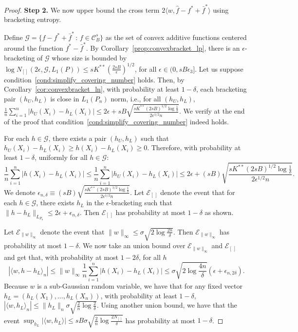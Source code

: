 \begin{proof}


\textbf{Step 2.} We now upper bound the cross term $2 \langle w,
\hat{f} - f^* + \bar{f}^* \rangle$ using bracketing entropy.

Define $\mathcal{G} =\{ f - f^* + \bar{f}^* \,:\, f \in
\mathcal{C}^s_B \}$ 
as the set of convex additive functions centered around the function $f^* - \bar{f}^*$. 
By Corollary~\ref{prop:convexbracket_lp}, there is an $\epsilon$-bracketing of $\mathcal{G}$ whose size is bounded by $\log N_{[]}( 2\epsilon, \mathcal{G}, L_1(P)) \leq sK^{**} \left( \frac{2sB}{\epsilon} \right)^{1/2}$, for all $\epsilon \in (0, sB \epsilon_3]$.
Let us suppose condition~\ref{cond:simplify_covering_number} holds. Then, by Corollary~\ref{cor:convexbracket_ln}, with probability at least $1-\delta$, each bracketing pair $(h_U, h_L)$ is close in $L_1(P_n)$ norm, i.e., for all $(h_U, h_L)$, 
$\frac{1}{n} \sum_{i=1}^n | h_U(X_i) - h_L(X_i) | \leq 2 \epsilon + sB \sqrt{ \frac{sK^{**}(2sB
)^{1/2} \log \frac{1}{\delta}}{2\epsilon^{1/2} n}}$. We verify at the
end of the proof that 
condition~\ref{cond:simplify_covering_number} indeed holds.

For each $h \in \mathcal{G}$, there exists a pair $(h_U, h_L)$ such that $h_U(X_i) - h_L(X_i) \geq h(X_i) - h_L(X_i) \geq 0$. Therefore, with probability at least $1-\delta$, uniformly for all $h \in \mathcal{G}$:
$$
\frac{1}{n} \sum_{i=1}^n |h(X_i) - h_L(X_i)| \leq \frac{1}{n} \sum_{i=1}^n | h_U(X_i) - h_L(X_i)| \leq 2\epsilon +  (sB) \sqrt{ \frac{sK^{**}(2sB)^{1/2} \log \frac{1}{\delta}}{2\epsilon^{1/2} n}}.
$$
We denote $\epsilon_{n,\delta} \equiv (sB) \sqrt{
  \frac{sK^{**}(2sB)^{1/2} \log \frac{1}{\delta}}{2\epsilon^{1/2}
    n}}$. Let $\mathcal{E}_{[\,]}$ denote the event that for each $h
\in \mathcal{G}$, there exists $h_L$ in the $\epsilon$-bracketing such
that $\|h-h_L\|_{L_{P_n}} \leq 2\epsilon + \epsilon_{n, \delta}$. Then
$\mathcal{E}_{[\,]}$ has probability at most $1-\delta$ as shown.

Let $\mathcal{E}_{\|w\|_\infty}$ denote the event that $\| w \|_\infty
\leq \sigma \sqrt{ 2\log \frac{2n}{\delta}}$.  Then
$\mathcal{E}_{\|w\|_\infty}$ has probability at most $1-\delta$. We
now take an union bound over $\mathcal{E}_{\|w\|_\infty}$ and
$\mathcal{E}_{[\,]}$ and get that, with probability at most
$1-2\delta$, for all $h$
\[
|\langle w, h - h_L\rangle_n| \leq \| w \|_\infty \frac{1}{n} \sum_{i=1}^n |h(X_i) - h_L(X_i)| \leq
  \sigma \sqrt{2 \log \frac{4n}{\delta}} \left( \epsilon + \epsilon_{n,2\delta} \right).
\]
Because $w$ is a sub-Gaussian random variable, we have that for any fixed vector
$h_L = (h_L(X_1),...,h_L(X_n))$, with probability at least $1-\delta$,
$|\langle w, h_L \rangle_n | \leq \| h_L \|_n \sigma \sqrt{
  \frac{2}{n} \log \frac{2}{\delta} }$. Using another union bound, we
have that the event $\sup_{h_L} |\langle w, h_L \rangle| \leq sB
\sigma \sqrt{ \frac{2}{n}\log \frac{2 N_{[]}}{\delta}}$ has
probability at most $1-\delta$.


\end{proof}
